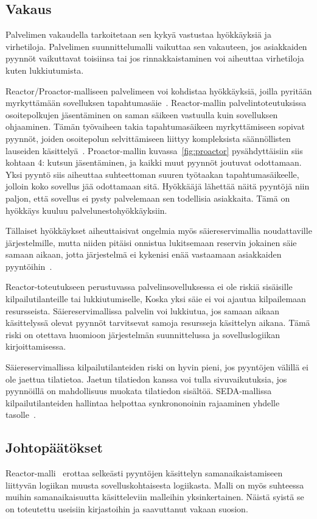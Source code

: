 \documentclass[finnish]{tktltiki2}%
\theoremstyle{definition}
\theoremstyle{remark}
\begin{document}
\subsection{Vakaus}
Palvelimen vakaudella tarkoitetaan sen kykyä vastustaa hyökkäyksiä ja
virhetiloja.
Palvelimen suunnittelumalli vaikuttaa sen vakauteen, jos asiakkaiden
pyynnöt vaikuttavat toisiinsa tai jos rinnakkaistaminen voi aiheuttaa virhetiloja kuten
lukkiutumista.

Reactor/Proactor-malliseen palvelimeen voi kohdistaa hyökkäyksiä, joilla pyritään
myrkyttämään sovelluksen tapahtumasäie~\cite{davis_case_2017}. Reactor-mallin palvelintoteutuksissa
osoitepolkujen jäsentäminen on saman säikeen vastuulla kuin sovelluksen ohjaaminen.
Tämän työvaiheen takia
tapahtumasäikeen myrkyttämiseen sopivat pyynnöt,
joiden osoitepolun selvittämiseen liittyy kompleksista
säännöllisten lauseiden käsittelyä~\cite{davis_case_2017}.
Proactor-mallin kuvassa~\ref{fig:proactor} pysähdyttäisiin 
siis kohtaan 4: kutsun jäsentäminen, ja
kaikki muut pyynnöt joutuvat odottamaan.
Yksi pyyntö siis aiheuttaa suhteettoman suuren työtaakan
tapahtumasäikeelle, jolloin koko sovellus jää odottamaan sitä.
Hyökkääjä lähettää näitä pyyntöjä niin paljon, että sovellus
ei pysty palvelemaan sen todellisia asiakkaita. Tämä
on hyökkäys kuuluu palvelunestohyökkäyksiin.

Tällaiset hyökkäykset aiheuttaisivat ongelmia myös säiereservimallia
noudattaville järjestelmille, mutta niiden pitäisi onnistua
lukitsemaan reservin jokainen säie samaan aikaan, jotta
järjestelmä ei kykenisi enää vastaamaan asiakkaiden pyyntöihin~\cite{davis_case_2017}.

Reactor-toteutukseen perustuvassa palvelinsovelluksessa ei ole
riskiä sisäisille kilpailutilanteille tai lukkiutumiselle, Koska
yksi säie ei voi ajautua kilpailemaan resursseista.
Säiereservimallissa palvelin voi lukkiutua, jos samaan aikaan käsittelyssä olevat
pyynnöt tarvitsevat samoja resursseja käsittelyn aikana. Tämä riski on otettava
huomioon järjestelmän suunnittelussa ja sovelluslogiikan kirjoittamisessa.

Säiereservimallissa kilpailutilanteiden riski on hyvin pieni, jos pyyntöjen
välillä ei ole jaettua tilatietoa. Jaetun tilatiedon kanssa voi tulla
sivuvaikutuksia, jos pyynnöillä on mahdollisuus muokata tilatiedon sisältöä.
SEDA-mallissa kilpailutilanteiden hallintaa helpottaa synkrononoinin
rajaaminen yhdelle tasolle~\cite{welsh_seda_2001}.

\subsection{Johtopäätökset}
Reactor-malli~\cite{schmidt_reactor:_1995} erottaa
selkeästi pyyntöjen käsittelyn
samanaikaistamiseen liittyvän
logiikan muusta sovelluskohtaisesta logiikasta.
Malli on myös suhteessa muihin samanaikaisuutta
käsitteleviin malleihin yksinkertainen.
Näistä syistä se on toteutettu useisiin
kirjastoihin ja saavuttanut vakaan suosion.
\end{document}
